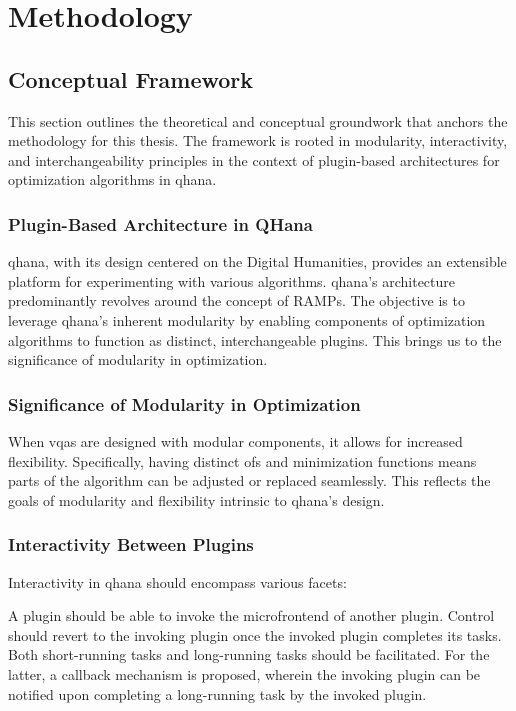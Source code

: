 \documentclass[
  a4paper,  %
  twoside,  %
  bibliography=totoc,
  headsepline,
  cleardoublepage=empty,
  parskip=half,
  draft=false
]{scrbook}
\begin{document}
\chapter{Methodology}
\label{chap:methodology}
\section{Conceptual Framework}
\label{sec:conceptualFramework}

This section outlines the theoretical and conceptual groundwork that anchors the methodology for this thesis.
The framework is rooted in modularity, interactivity, and interchangeability principles in the context of plugin-based architectures for optimization algorithms in \gls{qhana}.

\subsection{Plugin-Based Architecture in QHana}
\gls{qhana}, with its design centered on the Digital Humanities, provides an extensible platform for experimenting with various algorithms.
\gls{qhana}'s architecture predominantly revolves around the concept of RAMPs.
The objective is to leverage \gls{qhana}'s inherent modularity by enabling components of optimization algorithms to function as distinct, interchangeable plugins.
This brings us to the significance of modularity in optimization.

\subsection{Significance of Modularity in Optimization}
When \glspl{vqa} are designed with modular components, it allows for increased flexibility.
Specifically, having distinct \glspl{of} and minimization functions means parts of the algorithm can be adjusted or replaced seamlessly.
This reflects the goals of modularity and flexibility intrinsic to \gls{qhana}'s design.

\subsection{Interactivity Between Plugins}
Interactivity in \gls{qhana} should encompass various facets:

A plugin should be able to invoke the microfrontend of another plugin.
Control should revert to the invoking plugin once the invoked plugin completes its tasks.
Both short-running tasks and long-running tasks should be facilitated.
For the latter, a callback mechanism is proposed, wherein the invoking plugin can be notified upon completing a long-running task by the invoked plugin.
\end{document}
